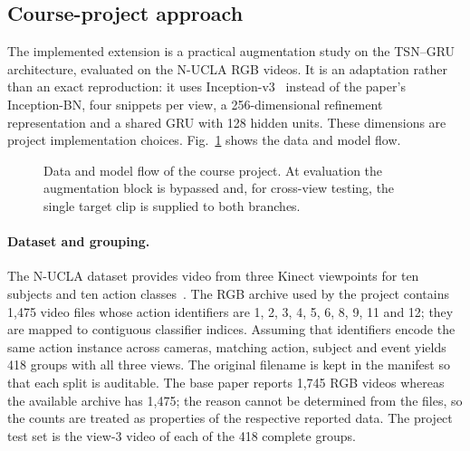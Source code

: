 \documentclass[runningheads]{llncs}
\begin{document}
\subsection{Course-project approach}
The implemented extension is a practical augmentation study on the TSN--GRU architecture, evaluated on the N-UCLA RGB videos. It is an adaptation rather than an exact reproduction: it uses Inception-v3~\cite{incv3} instead of the paper's Inception-BN, four snippets per view, a 256-dimensional refinement representation and a shared GRU with 128 hidden units. These dimensions are project implementation choices. Fig.~\ref{fig:pipeline} shows the data and model flow.

\begin{figure}[tb]
\centering
{}
\caption{Data and model flow of the course project. At evaluation the augmentation block is bypassed and, for cross-view testing, the single target clip is supplied to both branches.}
\label{fig:pipeline}
\end{figure}

\paragraph{Dataset and grouping.} The N-UCLA dataset provides video from three Kinect viewpoints for ten subjects and ten action classes~\cite{nucla}. The RGB archive used by the project contains 1,475 video files whose action identifiers are 1, 2, 3, 4, 5, 6, 8, 9, 11 and 12; they are mapped to contiguous classifier indices. Assuming that identifiers encode the same action instance across cameras, matching action, subject and event yields 418 groups with all three views. The original filename is kept in the manifest so that each split is auditable. The base paper reports 1,745 RGB videos whereas the available archive has 1,475; the reason cannot be determined from the files, so the counts are treated as properties of the respective reported data. The project test set is the view-3 video of each of the 418 complete groups.
\end{document}
